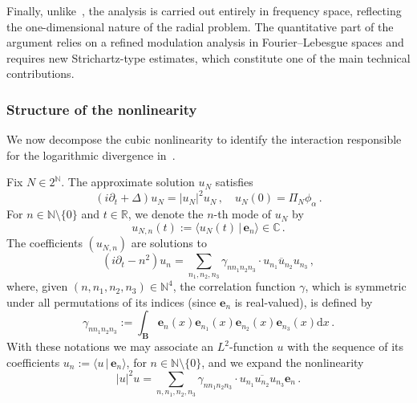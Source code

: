 \documentclass[11pt,reqno,english]{amsart}
\numberwithin{equation}{section}
\theoremstyle{plain}
\theoremstyle{definition}
\theoremstyle{remark}
\newcommand{\R}{\mathbb{R}}
\newcommand{\C}{\mathbb{C}}
\newcommand{\N}{\mathbb{N}}
\newcommand{\la}{\langle}
\newcommand{\ra}{\rangle}
\begin{document}
Finally, unlike~\cite{BCST24}, the analysis is carried out entirely in frequency space, reflecting the one-dimensional nature of the radial problem.
The quantitative part of the argument relies on a refined modulation analysis in Fourier--Lebesgue spaces and requires new Strichartz-type estimates, which constitute one of the main technical contributions.


\subsubsection{Structure of the nonlinearity}
We now decompose the cubic nonlinearity to identify the interaction responsible for the logarithmic divergence in~\cite{BB14}.

Fix $N\in 2^{\N}$. The approximate solution $u_{N}$ satisfies
\begin{equation}
	\label{eq:nlsN}
	(i\partial_{t}+\Delta)u_{N} = |u_{N}|^{2}u_{N}\,,\quad
	u_{N}(0) = \Pi_{N}\phi_{\alpha}\,.
\end{equation}
For $n\in\N\setminus\{0\}$ and $t\in\R$, we denote the $n$-th mode of $u_{N}$ by
\[
u_{N,n}(t):=\la u_{N}(t)\,|\,\mathbf{e}_{n}\ra \in\C\,.
\]
The coefficients $(u_{N,n})$ are solutions to
\[
(i\partial_{t}-n^2)u_{n} =
\sum_{n_{1},n_{2},n_{3}}
\gamma_{nn_{1}n_{2}n_{3}}\cdot
u_{n_1}\overline{u}_{n_2}u_{n_3}\,,
\]
where, given $(n,n_{1},n_{2},n_{3})\in\N^{4}$, the correlation function $\gamma$, which is symmetric under all permutations of its indices (since $\mathbf{e}_n$ is real-valued), is defined by
\begin{equation}
	\label{eq:gamma}
	\gamma_{nn_{1}n_{2}n_{3}}:=\int_{\mathbf{B}}\mathbf{e}_{n}(x)\mathbf{e}_{n_{1}}(x)\mathbf{e}_{n_{2}}(x)\mathbf{e}_{n_{3}}(x)\mathrm{d}x\,.
\end{equation}
With these notations we may associate an $L^{2}$-function $u$ with the sequence of its coefficients $u_{n}:=\la u\,|\,\mathbf{e}_{n}\ra$, for $n\in\N\setminus\{0\}$, and we expand the nonlinearity
\begin{equation}
	\label{eq:non}
	|u|^{2}u
	=
	\sum_{n,n_{1},n_{2},n_{3}}
	\gamma_{nn_{1}n_{2}n_{3}}\cdot
	u_{n_{1}}\overline{u_{n_{2}}}u_{n_{3}} \mathbf{e}_{n}\,.
\end{equation}
\end{document}
